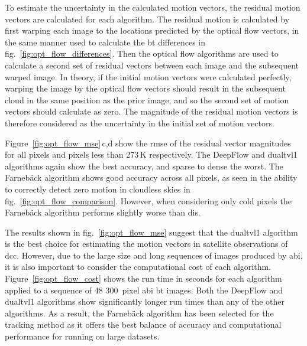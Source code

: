 To estimate the uncertainty in the calculated motion vectors, the residual motion vectors are calculated for each algorithm.
The residual motion is calculated by first warping each image to the locations predicted by the optical flow vectors, in the same manner used to calculate the \acrshort{bt} differences in fig.~\ref{fig:opt_flow_differences}.
Then the optical flow algorithms are used to calculate a second set of residual vectors between each image and the subsequent warped image.
In theory, if the initial motion vectors were calculated perfectly, warping the image by the optical flow vectors should result in the subsequent cloud in the same position as the prior image, and so the second set of motion vectors should calculate as zero.
The magnitude of the residual motion vectors is therefore considered as the uncertainty in the initial set of motion vectors.

Figure~\ref{fig:opt_flow_mse}\,c,d show the \acrshort{rmse} of the residual vector magnitudes for all pixels and pixels less than 273\,\unit{K} respectively.
The DeepFlow and \acrshort{dualtvl1} algorithms again show the best accuracy, and sparse to dense the worst.
The Farnebäck algorithm shows good accuracy across all pixels, as seen in the ability to correctly detect zero motion in cloudless skies in fig.~\ref{fig:opt_flow_comparison}.
However, when considering only cold pixels the Farnebäck algorithm performs slightly worse than \acrshort{dis}.

The results shown in fig.~\ref{fig:opt_flow_mse} suggest that the \acrshort{dualtvl1} algorithm is the best choice for estimating the motion vectors in satellite observations of \acrshort{dcc}.
However, due to the large size and long sequences of images produced by \acrshort{abi}, it is also important to consider the computational cost of each algorithm.
Figure~\ref{fig:opt_flow_cost} shows the run time in seconds for each algorithm applied to a sequence of 48 300~pixel \acrshort{abi} \acrshort{bt} images.
Both the DeepFlow and \acrshort{dualtvl1} algorithms show significantly longer run times than any of the other algorithms.
As a result, the Farnebäck algorithm has been selected for the tracking method as it offers the best balance of accuracy and computational performance for running on large datasets.


